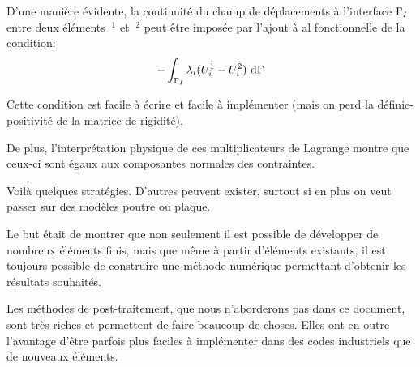 \begin{description}
	D'une manière évidente, la continuité du champ de déplacements
	à l'interface $\Gamma_I$ entre deux éléments $~^1$ et $~^2$ peut être
	imposée par l'ajout à al fonctionnelle de la condition:
	\begin{equation}   -\dint_{\li} \lambda_i(U_i^1-U_i^2)\ \dd\Gamma \end{equation}

	Cette condition est facile à écrire et facile à implémenter (mais on perd la
	définie-positivité de la matrice de rigidité).
	
	De plus, l'interprétation physique de ces multiplicateurs de Lagrange montre
	que ceux-ci sont égaux aux composantes normales des contraintes.
\end{description}
\medskip
Voilà quelques stratégies. D'autres peuvent exister, surtout si en plus on veut passer
sur des modèles poutre ou plaque.

Le but était de montrer que non seulement il est possible de développer de nombreux
éléments finis, mais que même à partir d'éléments existants, il est toujours
possible de construire une méthode numérique permettant d'obtenir les résultats
souhaités.

Les méthodes de post-traitement, que nous n'aborderons pas dans ce document,
sont très riches et permettent de faire beaucoup de choses.
Elles ont en outre l'avantage d'être parfois plus faciles à implémenter dans des
codes industriels que de nouveaux éléments.

\medskip
